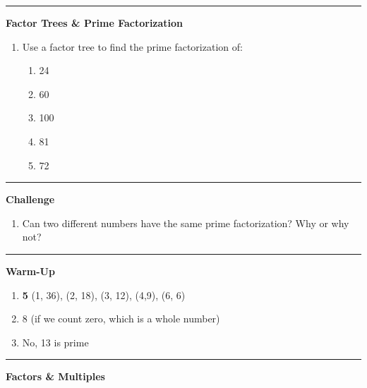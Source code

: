 \documentclass[
  letterpaper,
  DIV=11,
  numbers=noendperiod]{scrreprt}
\providecommand{\tightlist}{%
  \setlength{\itemsep}{0pt}\setlength{\parskip}{0pt}}
\begin{document}
\begin{center}\rule{0.5\linewidth}{0.5pt}\end{center}

\textbf{Factor Trees \& Prime Factorization}

\begin{enumerate}
\def\labelenumi{\arabic{enumi}.}
\setcounter{enumi}{4}
\item
  Use a factor tree to find the prime factorization of:

  \begin{enumerate}
  \def\labelenumii{\alph{enumii}.}
  \tightlist
  \item
    24
  \item
    60
  \item
    100
  \item
    81
  \item
    72
  \end{enumerate}
\end{enumerate}

\begin{center}\rule{0.5\linewidth}{0.5pt}\end{center}

\textbf{Challenge}

\begin{enumerate}
\def\labelenumi{\arabic{enumi}.}
\setcounter{enumi}{5}
\tightlist
\item
  Can two different numbers have the same prime factorization? Why or
  why not?
\end{enumerate}

\begin{center}\rule{0.5\linewidth}{0.5pt}\end{center}

\textbf{Warm-Up}

\begin{enumerate}
\def\labelenumi{\arabic{enumi}.}
\item
  \textbf{5} (1, 36), (2, 18), (3, 12), (4,9), (6, 6)
\item
  8 (if we count zero, which is a whole number)
\item
  No, 13 is prime
\end{enumerate}

\begin{center}\rule{0.5\linewidth}{0.5pt}\end{center}

\textbf{Factors \& Multiples}
\end{document}
